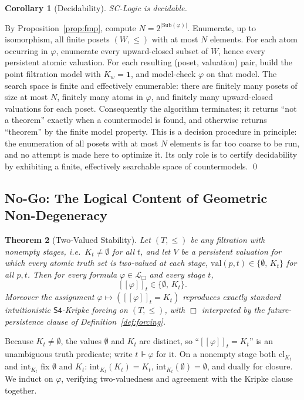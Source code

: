 \documentclass[final,12pt]{elsarticle}
\newcommand{\llbracket}{[\![}
\newcommand{\rrbracket}{]\!]}
\theoremstyle{plain}
\newtheorem{thm}{Theorem}[section]
\newtheorem{cor}[thm]{Corollary}
\theoremstyle{definition}
\begin{document}
\begin{cor}[Decidability]
\label{cor:decidability}
SC-Logic is decidable.
\end{cor}

\proof
By Proposition~\ref{prop:fmp}, compute
\(N=2^{|\mathrm{Sub}(\varphi)|}\). Enumerate, up to isomorphism, all finite posets
\((W,\le)\) with at most \(N\) elements. For each atom occurring in \(\varphi\),
enumerate every upward-closed subset of \(W\), hence every persistent atomic
valuation. For each resulting (poset, valuation) pair, build the point filtration
model with \(K_w=\mathbf 1\), and model-check \(\varphi\) on that model. The search
space is finite and effectively enumerable: there are finitely many posets of size
at most \(N\), finitely many atoms in \(\varphi\), and finitely many upward-closed
valuations for each poset. Consequently the algorithm terminates; it returns
``not a theorem'' exactly when a countermodel is found, and otherwise returns
``theorem'' by the finite model property.
This is a decision procedure in principle: the enumeration of all posets with at
most \(N\) elements is far too coarse to be run, and no attempt is made here to
optimize it. Its only role is to certify decidability by exhibiting a finite,
effectively searchable space of countermodels.
\qed

\subsection{No-Go: The Logical Content of Geometric Non-Degeneracy}
\label{subsec:inertness}

\begin{thm}[Two-Valued Stability]
\label{thm:two-valued-stability}
Let \((T,\le)\) be any filtration with nonempty stages, i.e.\ \(K_t\neq\emptyset\)
for all \(t\), and let \(V\) be a persistent valuation for which every atomic
truth set is two-valued at each stage,
\(\mathrm{val}(p,t)\in\{\emptyset,\,K_t\}\) for all \(p,t\). Then for every formula
\(\varphi\in\mathcal{L}_\Box\) and every stage \(t\),
\[
  \llbracket\varphi\rrbracket_t\in\{\emptyset,\,K_t\}.
\]
Moreover the assignment \(\varphi\mapsto(\llbracket\varphi\rrbracket_t=K_t)\)
reproduces exactly standard intuitionistic \(\mathsf{S4}\)-Kripke forcing on
\((T,\le)\), with \(\Box\) interpreted by the future-persistence clause of
Definition~\ref{def:forcing}.
\end{thm}

\proof
Because \(K_t\neq\emptyset\), the values \(\emptyset\) and \(K_t\) are distinct, so
``\(\llbracket\varphi\rrbracket_t=K_t\)'' is an unambiguous truth predicate; write
\(t\Vdash\varphi\) for it. On a nonempty stage both \(\mathrm{cl}_{K_t}\) and
\(\mathrm{int}_{K_t}\) fix \(\emptyset\) and \(K_t\): \(\mathrm{int}_{K_t}(K_t)=K_t\),
\(\mathrm{int}_{K_t}(\emptyset)=\emptyset\), and dually for closure. We induct on
\(\varphi\), verifying two-valuedness and agreement with the Kripke clause together.
\end{document}
